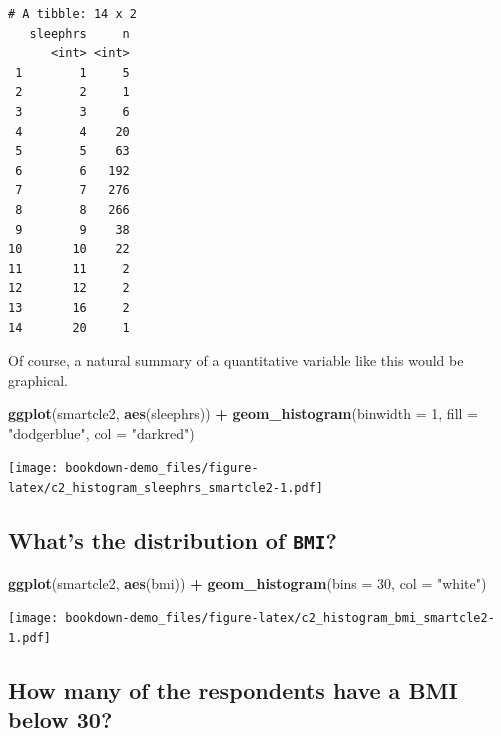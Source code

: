 \documentclass[]{book}
\newenvironment{Shaded}{\begin{snugshade}}{\end{snugshade}}
\newcommand{\KeywordTok}[1]{\textcolor[rgb]{0.13,0.29,0.53}{\textbf{#1}}}
\newcommand{\DataTypeTok}[1]{\textcolor[rgb]{0.13,0.29,0.53}{#1}}
\newcommand{\DecValTok}[1]{\textcolor[rgb]{0.00,0.00,0.81}{#1}}
\newcommand{\StringTok}[1]{\textcolor[rgb]{0.31,0.60,0.02}{#1}}
\newcommand{\OperatorTok}[1]{\textcolor[rgb]{0.81,0.36,0.00}{\textbf{#1}}}
\newcommand{\NormalTok}[1]{#1}
\theoremstyle{definition}
\theoremstyle{definition}
\theoremstyle{definition}
\theoremstyle{remark}
\begin{document}
\begin{verbatim}
# A tibble: 14 x 2
   sleephrs     n
      <int> <int>
 1        1     5
 2        2     1
 3        3     6
 4        4    20
 5        5    63
 6        6   192
 7        7   276
 8        8   266
 9        9    38
10       10    22
11       11     2
12       12     2
13       16     2
14       20     1
\end{verbatim}

Of course, a natural summary of a quantitative variable like this would
be graphical.

\begin{Shaded}
\begin{Highlighting}[]
\KeywordTok{ggplot}\NormalTok{(smartcle2, }\KeywordTok{aes}\NormalTok{(sleephrs)) }\OperatorTok{+}
\StringTok{    }\KeywordTok{geom_histogram}\NormalTok{(}\DataTypeTok{binwidth =} \DecValTok{1}\NormalTok{, }\DataTypeTok{fill =} \StringTok{"dodgerblue"}\NormalTok{, }\DataTypeTok{col =} \StringTok{"darkred"}\NormalTok{)}
\end{Highlighting}
\end{Shaded}

\texttt{[image: bookdown-demo\_files/figure-latex/c2\_histogram\_sleephrs\_smartcle2-1.pdf]}

\subsection{\texorpdfstring{What's the distribution of
\texttt{BMI}?}{What's the distribution of BMI?}}\label{whats-the-distribution-of-bmi}

\begin{Shaded}
\begin{Highlighting}[]
\KeywordTok{ggplot}\NormalTok{(smartcle2, }\KeywordTok{aes}\NormalTok{(bmi)) }\OperatorTok{+}
\StringTok{    }\KeywordTok{geom_histogram}\NormalTok{(}\DataTypeTok{bins =} \DecValTok{30}\NormalTok{, }\DataTypeTok{col =} \StringTok{"white"}\NormalTok{)}
\end{Highlighting}
\end{Shaded}

\texttt{[image: bookdown-demo\_files/figure-latex/c2\_histogram\_bmi\_smartcle2-1.pdf]}

\subsection{How many of the respondents have a BMI below
30?}\label{how-many-of-the-respondents-have-a-bmi-below-30}
\end{document}
